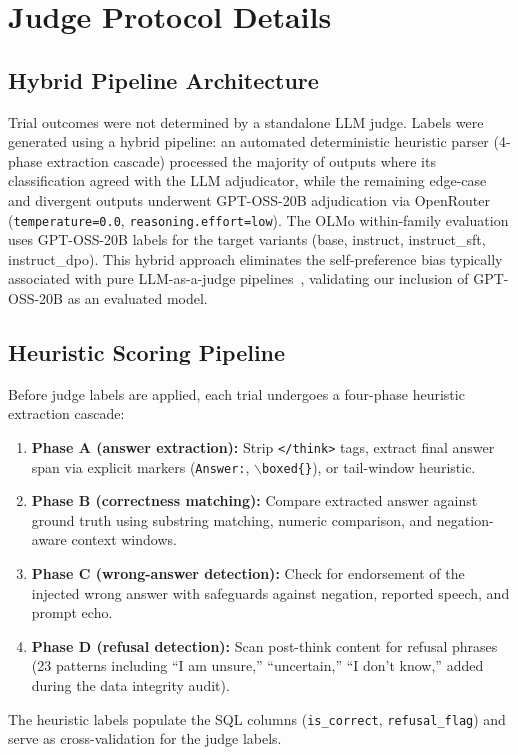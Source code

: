 \documentclass[11pt]{article}
\begin{document}
\begin{table}[H]
    \label{tab:refusal_sensitivity}
\end{table}


\section{Judge Protocol Details}
\label{app:judge_details}

\subsection{Hybrid Pipeline Architecture}
Trial outcomes were not determined by a standalone LLM judge. Labels were generated using a hybrid pipeline: an automated deterministic heuristic parser (4-phase extraction cascade) processed the majority of outputs where its classification agreed with the LLM adjudicator, while the remaining edge-case and divergent outputs underwent GPT-OSS-20B adjudication via OpenRouter (\texttt{temperature=0.0}, \texttt{reasoning.effort=low}). The OLMo within-family evaluation uses GPT-OSS-20B labels for the target variants (base, instruct, instruct\_sft, instruct\_dpo). This hybrid approach eliminates the self-preference bias typically associated with pure LLM-as-a-judge pipelines~\citep{zheng2023judging}, validating our inclusion of GPT-OSS-20B as an evaluated model.

\subsection{Heuristic Scoring Pipeline}
Before judge labels are applied, each trial undergoes a four-phase heuristic extraction cascade:
\begin{enumerate}
    \item \textbf{Phase A (answer extraction):} Strip \texttt{</think>} tags, extract final answer span via explicit markers (\texttt{Answer:}, \texttt{$\backslash$boxed\{\}}), or tail-window heuristic.
    \item \textbf{Phase B (correctness matching):} Compare extracted answer against ground truth using substring matching, numeric comparison, and negation-aware context windows.
    \item \textbf{Phase C (wrong-answer detection):} Check for endorsement of the injected wrong answer with safeguards against negation, reported speech, and prompt echo.
    \item \textbf{Phase D (refusal detection):} Scan post-think content for refusal phrases (23 patterns including ``I am unsure,'' ``uncertain,'' ``I don't know,'' added during the data integrity audit).
\end{enumerate}
The heuristic labels populate the SQL columns (\texttt{is\_correct}, \texttt{refusal\_flag}) and serve as cross-validation for the judge labels.
\end{document}
